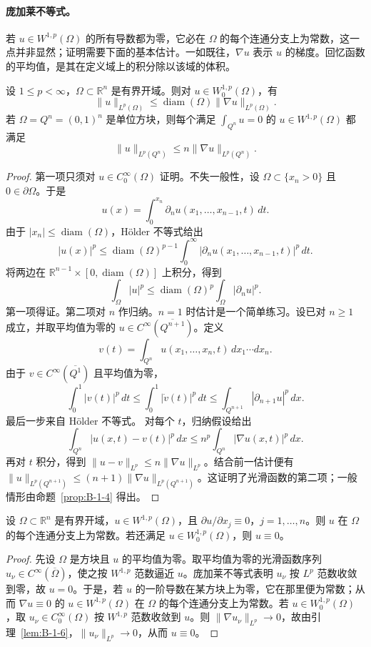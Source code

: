 \paragraph{庞加莱不等式。} 若 $u\in W^{1,p}(\Omega)$ 的所有导数都为零，它必在 $\Omega$ 的每个连通分支上为常数，这一点并非显然；证明需要下面的基本估计。一如既往，$\nabla u$ 表示 $u$ 的梯度。回忆函数的平均值，是其在定义域上的积分除以该域的体积。

\begin{lemma}\label{lem:B-1-6}
设 $1\le p<\infty$，$\Omega\subset\mathbb R^n$ 是有界开域。则对 $u\in W_0^{1,p}(\Omega)$，有
\[
  \|u\|_{L^p(\Omega)}\le\operatorname{diam}(\Omega)\|\nabla u\|_{L^p(\Omega)}.
\]
若 $\Omega=Q^n=(0,1)^n$ 是单位方块，则每个满足 $\int_{Q^n}u=0$ 的 $u\in W^{1,p}(\Omega)$ 都满足
\[
  \|u\|_{L^p(Q^n)}\le n\|\nabla u\|_{L^p(Q^n)}.
\]
\end{lemma}
\begin{proof}
第一项只须对 $u\in C_0^\infty(\Omega)$ 证明。不失一般性，设 $\Omega\subset\{x_n>0\}$ 且 $0\in\partial\Omega$。于是
\[
  u(x)=\int_0^{x_n}\partial_n u(x_1,\ldots,x_{n-1},t)\,dt.
\]
由于 $|x_n|\le\operatorname{diam}(\Omega)$，Hölder 不等式给出
\[
  |u(x)|^p\le\operatorname{diam}(\Omega)^{p-1}
  \int_0^\infty|\partial_nu(x_1,\ldots,x_{n-1},t)|^p\,dt.
\]
将两边在 $\mathbb R^{n-1}\times[0,\operatorname{diam}(\Omega)]$ 上积分，得到
\[
  \int_\Omega|u|^p\le\operatorname{diam}(\Omega)^p\int_\Omega|\partial_nu|^p.
\]
第一项得证。第二项对 $n$ 作归纳。$n=1$ 时估计是一个简单练习。设已对 $n\ge1$ 成立，并取平均值为零的 $u\in C^\infty(\overline{Q^{n+1}})$。定义
\[
  v(t)=\int_{Q^n}u(x_1,\ldots,x_n,t)\,dx_1\cdots dx_n.
\]
由于 $v\in C^\infty(\overline{Q^1})$ 且平均值为零，
\[
  \int_0^1|v(t)|^p\,dt\le\int_0^1|\dot v(t)|^p\,dt
  \le\int_{Q^{n+1}}|\partial_{n+1}u|^p\,dx.
\]
最后一步来自 Hölder 不等式。
对每个 $t$，归纳假设给出
\[
  \int_{Q^n}|u(x,t)-v(t)|^p\,dx
  \le n^p\int_{Q^n}|\nabla u(x,t)|^p\,dx.
\]
再对 $t$ 积分，得到 $\|u-v\|_{L^p}\le n\|\nabla u\|_{L^p}$。结合前一估计便有 $\|u\|_{L^p(Q^{n+1})}\le(n+1)\|\nabla u\|_{L^p(Q^{n+1})}$。这证明了光滑函数的第二项；一般情形由命题~\ref{prop:B-1-4} 得出。
\end{proof}

\begin{corollary}\label{cor:B-1-7}
设 $\Omega\subset\mathbb R^n$ 是有界开域，$u\in W^{1,p}(\Omega)$，且 $\partial u/\partial x_j\equiv0$，$j=1,\ldots,n$。则 $u$ 在 $\Omega$ 的每个连通分支上为常数。若还满足 $u\in W_0^{1,p}(\Omega)$，则 $u\equiv0$。
\end{corollary}
\begin{proof}
先设 $\Omega$ 是方块且 $u$ 的平均值为零。取平均值为零的光滑函数序列 $u_\nu\in C^\infty(\overline\Omega)$，使之按 $W^{1,p}$ 范数逼近 $u$。庞加莱不等式表明 $u_\nu$ 按 $L^p$ 范数收敛到零，故 $u=0$。于是，若 $u$ 的一阶导数在某方块上为零，它在那里便为常数；从而 $\nabla u\equiv0$ 的 $u\in W^{1,p}(\Omega)$ 在 $\Omega$ 的每个连通分支上为常数。若 $u\in W_0^{1,p}(\Omega)$，取 $u_\nu\in C_0^\infty(\Omega)$ 按 $W^{1,p}$ 范数收敛到 $u$。则 $\|\nabla u_\nu\|_{L^p}\to0$，故由引理~\ref{lem:B-1-6}，$\|u_\nu\|_{L^p}\to0$，从而 $u\equiv0$。
\end{proof}

